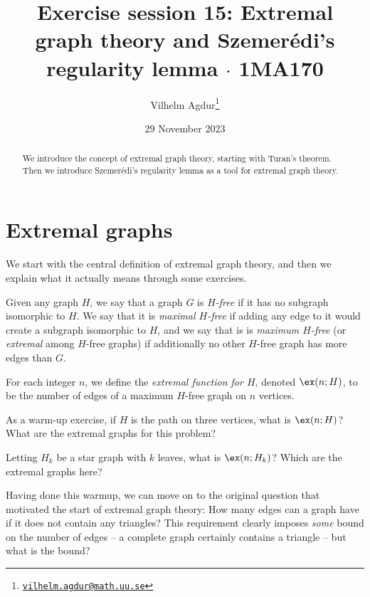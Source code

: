 \documentclass[nobib]{tufte-handout}
\title{Exercise session 15: Extremal graph theory and Szemerédi's regularity lemma $\cdot$ 1MA170}
\author[Vilhelm Agdur]{Vilhelm Agdur\thanks{\href{mailto:vilhelm.agdur@math.uu.se}{\nolinkurl{vilhelm.agdur@math.uu.se}}}}
\date{29 November 2023}
\begin{document}
\maketitle%

\begin{abstract}
\noindent
We introduce the concept of extremal graph theory, starting with Turan's theorem. Then we introduce Szemerédi's regularity lemma as a tool for extremal graph theory.
\end{abstract}

\section{Extremal graphs}

We start with the central definition of extremal graph theory, and then we explain what it actually means through some exercises.

\begin{definition}
  Given any graph $H$, we say that a graph $G$ is \emph{$H$-free} if it has no subgraph isomorphic to $H$. We say that it is \emph{maximal $H$-free} if adding any edge to it would create a subgraph isomorphic to $H$, and we say that is is \emph{maximum $H$-free} (or \emph{extremal} among $H$-free graphs) if additionally no other $H$-free graph has more edges than $G$.

  For each integer $n$, we define the \emph{extremal function for $H$}, denoted $\ex(n; H)$, to be the number of edges of a maximum $H$-free graph on $n$ vertices.
\end{definition}

\begin{xca}
  As a warm-up exercise, if $H$ is the path on three vertices, what is $\ex(n;H)$? What are the extremal graphs for this problem?

  Letting $H_k$ be a star graph with $k$ leaves, what is $\ex(n;H_k)$? Which are the extremal graphs here?
\end{xca}

Having done this warmup, we can move on to the original question that motivated the start of extremal graph theory: How many edges can a graph have if it does not contain any triangles? This requirement clearly imposes \emph{some} bound on the number of edges -- a complete graph certainly contains a triangle -- but what is the bound?
\end{document}
